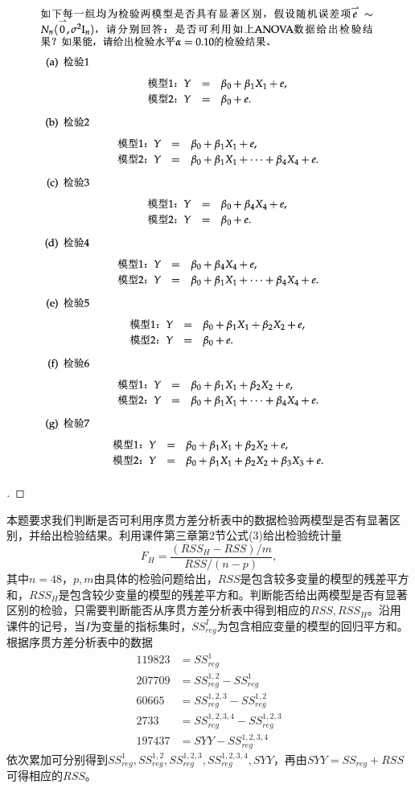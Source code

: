 \documentclass[cn,hazy,green,12pt,normal]{elegantnote}
\numberwithin{equation}{section}
\numberwithin{subsection}{section}
\begin{document}
    \begin{figure}[!htbp]
        \centering
        \includegraphics[width=30em]{image/hw4_plt22.png}
    \end{figure}

\begin{proof}[\solutionname]
\end{proof}

本题要求我们判断是否可利用序贯方差分析表中的数据检验两模型是否有显著区别，并给出检验结果。利用课件第三章第2节公式(3)给出检验统计量
$$
F_H = \frac{(RSS_H - RSS)/m}{RSS/(n-p)},
$$
其中$n=48$，$p,m$由具体的检验问题给出，$RSS$是包含较多变量的模型的残差平方和，$RSS_H$是包含较少变量的模型的残差平方和。判断能否给出两模型是否有显著区别的检验，只需要判断能否从序贯方差分析表中得到相应的$RSS,RSS_H$。沿用课件的记号，当$I$为变量的指标集时，$SS_{reg}^I$为包含相应变量的模型的回归平方和。根据序贯方差分析表中的数据
\begin{align*}
    119823 &= SS_{reg}^1 \\
    207709 &= SS_{reg}^{1,2} - SS_{reg}^{1} \\
    60665 &= SS_{reg}^{1,2,3} - SS_{reg}^{1,2} \\
    2733 &= SS_{reg}^{1,2,3,4} - SS_{reg}^{1,2,3} \\
    197437 &= SYY - SS_{reg}^{1,2,3,4}
\end{align*}
依次累加可分别得到$SS_{reg}^{1},SS_{reg}^{1,2},SS_{reg}^{1,2,3},SS_{reg}^{1,2,3,4},SYY$，再由$SYY = SS_{reg} + RSS$可得相应的$RSS$。
\end{document}
